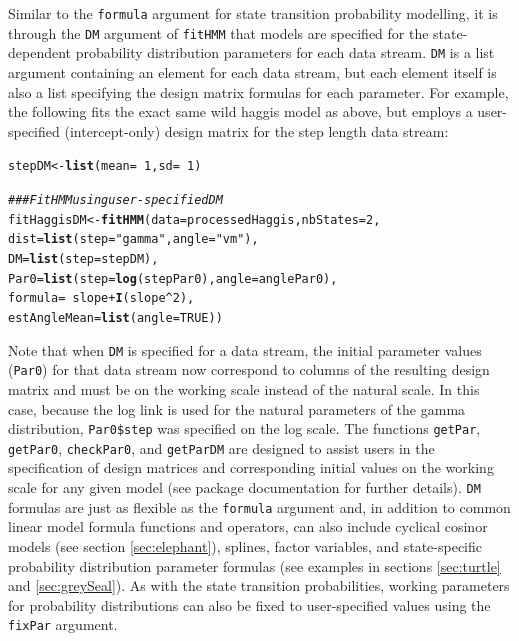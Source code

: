 \documentclass[12pt]{article}\usepackage[]{graphicx}\usepackage[]{xcolor}
\makeatletter
\newcommand{\hlnum}[1]{\textcolor[rgb]{0.686,0.059,0.569}{#1}}%
\newcommand{\hlsng}[1]{\textcolor[rgb]{0.192,0.494,0.8}{#1}}%
\newcommand{\hlcom}[1]{\textcolor[rgb]{0.678,0.584,0.686}{\textit{#1}}}%
\newcommand{\hlopt}[1]{\textcolor[rgb]{0,0,0}{#1}}%
\newcommand{\hldef}[1]{\textcolor[rgb]{0.345,0.345,0.345}{#1}}%
\newcommand{\hlkwb}[1]{\textcolor[rgb]{0.69,0.353,0.396}{#1}}%
\newcommand{\hlkwc}[1]{\textcolor[rgb]{0.333,0.667,0.333}{#1}}%
\newcommand{\hlkwd}[1]{\textcolor[rgb]{0.737,0.353,0.396}{\textbf{#1}}}%
\newenvironment{kframe}{%
 \def\at@end@of@kframe{}%
 \ifinner\ifhmode%
  \def\at@end@of@kframe{\end{minipage}}%
  \begin{minipage}{\columnwidth}%
 \fi\fi%
 \def\FrameCommand##1{\hskip\@totalleftmargin \hskip-\fboxsep
 \colorbox{shadecolor}{##1}\hskip-\fboxsep
     \hskip-\linewidth \hskip-\@totalleftmargin \hskip\columnwidth}%
 \MakeFramed {\advance\hsize-\width
   \@totalleftmargin\z@ \linewidth\hsize
   \@setminipage}}%
 {\par\unskip\endMakeFramed%
 \at@end@of@kframe}
\newenvironment{knitrout}{}{} %
\makeatother
\begin{document}
Similar to the \verb|formula| argument for state transition probability modelling, it is through the \verb|DM| argument of \verb|fitHMM| that models are specified for the state-dependent probability distribution parameters for each data stream.  \verb|DM| is a list argument containing an element for each data stream, but each element itself is also a list specifying the design matrix formulas for each parameter. For example, the following fits the exact same wild haggis model as above, but employs a user-specified (intercept-only) design matrix for the step length data stream:
\begin{knitrout}
\color{fgcolor}\begin{kframe}
\begin{alltt}
\hldef{stepDM} \hlkwb{<-} \hlkwd{list}\hldef{(}\hlkwc{mean} \hldef{=} \hlopt{~}\hlnum{1}\hldef{,} \hlkwc{sd} \hldef{=} \hlopt{~}\hlnum{1}\hldef{)}

\hlcom{### Fit HMM	using user-specified DM}
\hldef{fitHaggisDM} \hlkwb{<-} \hlkwd{fitHMM}\hldef{(}\hlkwc{data} \hldef{= processedHaggis,} \hlkwc{nbStates} \hldef{=} \hlnum{2}\hldef{,}
                      \hlkwc{dist} \hldef{=} \hlkwd{list}\hldef{(}\hlkwc{step} \hldef{=} \hlsng{"gamma"}\hldef{,} \hlkwc{angle} \hldef{=} \hlsng{"vm"}\hldef{),}
                      \hlkwc{DM} \hldef{=} \hlkwd{list}\hldef{(}\hlkwc{step} \hldef{= stepDM),}
                      \hlkwc{Par0} \hldef{=} \hlkwd{list}\hldef{(}\hlkwc{step} \hldef{=} \hlkwd{log}\hldef{(stepPar0),} \hlkwc{angle} \hldef{= anglePar0),}
                      \hlkwc{formula} \hldef{=} \hlopt{~} \hldef{slope} \hlopt{+} \hlkwd{I}\hldef{(slope}\hlopt{^}\hlnum{2}\hldef{),}
                      \hlkwc{estAngleMean} \hldef{=} \hlkwd{list}\hldef{(}\hlkwc{angle}\hldef{=}\hlnum{TRUE}\hldef{))}
\end{alltt}
\end{kframe}
\end{knitrout}
Note that when \verb|DM| is specified for a data stream, the initial parameter values (\verb|Par0|) for that data stream now correspond to columns of the resulting design matrix and must be on the working scale instead of the natural scale.  In this case, because the log link is used for the natural parameters of the gamma distribution, \verb|Par0$step| was specified on the log scale.  The functions \verb|getPar|, \verb|getPar0|, \verb|checkPar0|, and \verb|getParDM| are designed to assist users in the specification of design matrices and corresponding initial values on the working scale for any given model (see package documentation for further details).  \verb|DM| formulas are just as flexible as the \verb|formula| argument and, in addition to common linear model formula functions and operators, can also include cyclical cosinor models (see section \ref{sec:elephant}), splines, factor variables, and state-specific probability distribution parameter formulas (see examples in sections \ref{sec:turtle} and \ref{sec:greySeal}). As with the state transition probabilities, working parameters for probability distributions can also be fixed to user-specified values using the \verb|fixPar| argument.
\end{document}
